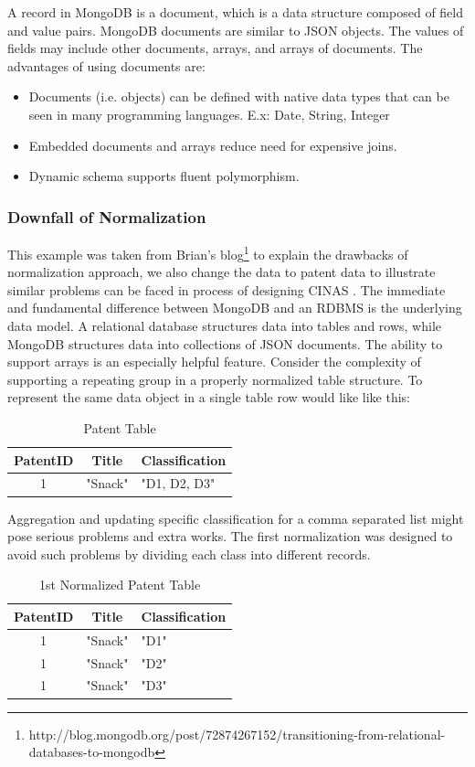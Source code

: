 \documentclass{article}
\begin{document}
A record in MongoDB is a document, which is a data structure composed of field and value pairs. MongoDB documents are similar to JSON objects. The values of fields may include other documents, arrays, and arrays of documents. The advantages of using documents are:
\begin{itemize}
\item Documents (i.e. objects) can be defined with native data types that can be seen in many programming languages. E.x: Date, String, Integer
\item Embedded documents and arrays reduce need for expensive joins.
\item Dynamic schema supports fluent polymorphism.
\end{itemize}

\subsubsection{Downfall of Normalization }
This example was taken from Brian's blog\footnote{http://blog.mongodb.org/post/72874267152/transitioning-from-relational-databases-to-mongodb} to explain the drawbacks of normalization approach, we also change the data to patent data to illustrate similar problems can be faced in process of designing CINAS . The immediate and fundamental difference between MongoDB and an RDBMS is the underlying data model. A relational database structures data into tables and rows, while MongoDB structures data into collections of JSON documents. The ability to support arrays is an especially helpful feature. Consider the complexity of supporting a repeating group in a properly normalized table structure. To represent the same data object in a single table row would like like this:
\begin{table}[H]
\begin{tabular}{|c|c|l|} \hline
PatentID&Title&Classification\\ \hline
1& "Snack"& "D1, D2, D3"\\ \hline
\end{tabular}
\centering
\caption{Patent Table}
\end{table}
Aggregation and updating specific classification for a comma separated list might pose serious problems and extra works. The first normalization was designed to avoid such problems by dividing each class into different records.

\begin{table}[H]
\begin{tabular}{|c|c|l|} \hline
PatentID&Title&Classification\\ \hline
1& "Snack"& "D1"\\ \hline
1& "Snack"& "D2"\\ \hline
1& "Snack"& "D3"\\ \hline
\end{tabular}
\centering
\caption{1st Normalized Patent Table}
\end{table}
\end{document}
